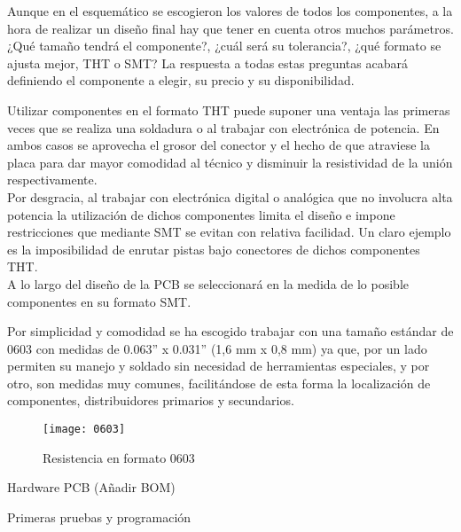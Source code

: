 Aunque en el esquemático se escogieron los valores de todos los componentes, a la hora de realizar un diseño final hay que tener en cuenta otros muchos parámetros. ¿Qué tamaño tendrá el componente?, ¿cuál será su tolerancia?, ¿qué formato se ajusta mejor, \acrshort{THT} o \acrshort{SMT}? La respuesta a todas estas preguntas acabará definiendo el componente a elegir, su precio y su disponibilidad.

Utilizar componentes en el formato THT puede suponer una ventaja las primeras veces que se realiza una soldadura o al trabajar con electrónica de potencia. En ambos casos se aprovecha el grosor del conector y el hecho de que atraviese la placa para dar mayor comodidad al técnico y disminuir la resistividad de la unión respectivamente. 
\\Por desgracia, al trabajar con electrónica digital o analógica que no involucra alta potencia la utilización de dichos componentes limita el diseño e impone restricciones que mediante SMT se evitan con relativa facilidad. Un claro ejemplo es la imposibilidad de enrutar pistas bajo conectores de dichos componentes THT.
\\A lo largo del diseño de la PCB se seleccionará en la medida de lo posible componentes en su formato SMT.

Por simplicidad y comodidad se ha escogido trabajar con una tamaño estándar de 0603 con medidas de 0.063'' x 0.031'' (1,6 mm x 0,8 mm) ya que, por un lado permiten su manejo y soldado sin necesidad de herramientas especiales, y por otro, son medidas muy comunes, facilitándose de esta forma la localización de componentes, distribuidores primarios y secundarios.

\begin{figure} [h]
    \centering
    \texttt{[image: 0603]}
    \caption{Resistencia en formato 0603 \cite{Imagen_0603}}
    \label{fig:0603}
\end{figure}

Hardware
	PCB (Añadir BOM)
	
	Primeras pruebas y programación
	